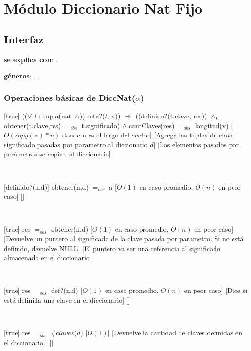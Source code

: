 \section{Módulo Diccionario Nat Fijo}

\subsection{Interfaz}

\textbf{se explica con}: .

\textbf{géneros}: , .

\subsubsection{Operaciones básicas de DiccNat($\alpha$)}

[true]
{(($\forall$ $t$ : tupla(nat, $\alpha$)) esta?($t$, v)) $\Rightarrow$ ((definido?(t.clave, res))
	$\land_L$ obtener(t.clave,res) $=_{obs}$ t.significado) $\land$ cantClaves(res) $=_{obs}$ longitud(v)}
[$O(copy(\alpha) * n)$ donde n es el largo del vector]
[Agrega las tuplas de clave-significado pasadas por parametro al diccionario $d$]
[Los elementos pasados por parámetros se copian al diccionario]

~

[definido?(n,d)]
{obtener(n,d) $=_{obs}$ a}
[$O(1)$ en caso promedio, $O(n)$ en peor caso]
[]

~

[true]
{res $=_{obs}$ obtener(n,d)}
[$O(1)$ en caso promedio, $O(n)$ en peor caso]
[Devuelve un puntero al significado de la clave pasada por parametro. Si no está definido, devuelve NULL]
[El puntero va ser una referencia al significado almacenado en el diccionario]

~

[true]
{res $=_{obs}$ def?(n,d)}
[$O(1)$ en caso promedio, $O(n)$ en peor caso]
[Dice si está definida una clave en el diccionario]
[]

~

[true]
{res $=_{obs} \ \# claves$($d$)}
[$O(1)$]
[Devuelve la cantidad de claves definidas en el diccionario.]
[]

